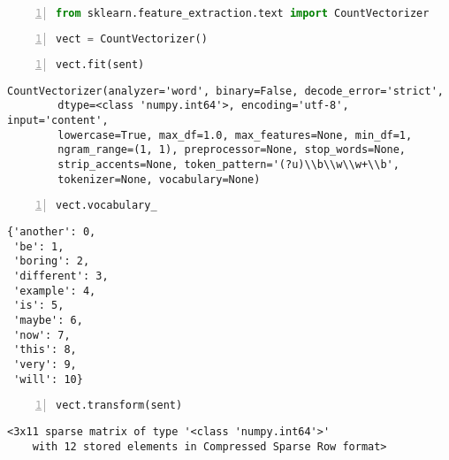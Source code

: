 \documentclass[10pt,parskip=half,
	toc=sectionentrywithdots,
	bibliography=totocnumbered,
	captions=tableheading,numbers=noendperiod]{scrartcl}
\begin{document}
\begin{lstlisting}[language=Python,numbers=left,xleftmargin=20pt,xrightmargin=5pt,belowskip=5pt,aboveskip=5pt]
from sklearn.feature_extraction.text import CountVectorizer
\end{lstlisting}

\begin{lstlisting}[language=Python,numbers=left,xleftmargin=20pt,xrightmargin=5pt,belowskip=5pt,aboveskip=5pt]
vect = CountVectorizer()
\end{lstlisting}

\begin{lstlisting}[language=Python,numbers=left,xleftmargin=20pt,xrightmargin=5pt,belowskip=5pt,aboveskip=5pt]
vect.fit(sent)
\end{lstlisting}

\begin{lstlisting}[language={},postbreak={},numbers=none,xrightmargin=7pt,breakindent=0pt,aboveskip=5pt,belowskip=5pt]
CountVectorizer(analyzer='word', binary=False, decode_error='strict',
        dtype=<class 'numpy.int64'>, encoding='utf-8', input='content',
        lowercase=True, max_df=1.0, max_features=None, min_df=1,
        ngram_range=(1, 1), preprocessor=None, stop_words=None,
        strip_accents=None, token_pattern='(?u)\\b\\w\\w+\\b',
        tokenizer=None, vocabulary=None)
\end{lstlisting}

\begin{lstlisting}[language=Python,numbers=left,xleftmargin=20pt,xrightmargin=5pt,belowskip=5pt,aboveskip=5pt]
vect.vocabulary_
\end{lstlisting}

\begin{lstlisting}[language={},postbreak={},numbers=none,xrightmargin=7pt,breakindent=0pt,aboveskip=5pt,belowskip=5pt]
{'another': 0,
 'be': 1,
 'boring': 2,
 'different': 3,
 'example': 4,
 'is': 5,
 'maybe': 6,
 'now': 7,
 'this': 8,
 'very': 9,
 'will': 10}
\end{lstlisting}

\begin{lstlisting}[language=Python,numbers=left,xleftmargin=20pt,xrightmargin=5pt,belowskip=5pt,aboveskip=5pt]
vect.transform(sent)
\end{lstlisting}

\begin{lstlisting}[language={},postbreak={},numbers=none,xrightmargin=7pt,breakindent=0pt,aboveskip=5pt,belowskip=5pt]
<3x11 sparse matrix of type '<class 'numpy.int64'>'
	with 12 stored elements in Compressed Sparse Row format>
\end{lstlisting}
\end{document}
